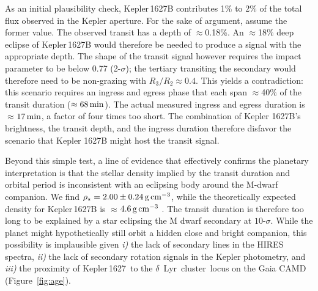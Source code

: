 \documentclass[12pt,modern,twocolumn,tighten]{aastex63}
\newcommand{\cn}{$\delta$\ Lyr\ cluster} %
\newcommand{\sn}{Kepler\,1627} %
\begin{document}

As an initial plausibility check, Kepler\,1627B contributes 1\% to 2\%
of the total flux observed in the Kepler aperture.  For the sake of
argument, assume the former value.  The observed transit has a depth
of $\approx$0.18\%.  An $\approx$18\% deep eclipse of Kepler\,1627B would
therefore be needed to produce a signal with the appropriate depth.
The shape of the transit signal however requires the impact parameter
to be below 0.77 (2-$\sigma$); the tertiary transiting the secondary
would therefore need to be non-grazing with $R_3/R_2 \approx 0.4$.
This yields a contradiction:  this scenario requires an ingress
and egress phase that each span $\approx$40\% of the transit duration
($\approx 68\,{\rm min}$).  The actual measured ingress and egress
duration is $\approx$$17\,{\rm min}$, a factor of four times too
short.  The combination of Kepler 1627B's brightness, the transit
depth, and the ingress duration therefore disfavor the scenario that
Kepler 1627B might host the transit signal.  

Beyond this simple test, a line of evidence that
effectively confirms the planetary interpretation is that the stellar density
implied by the transit duration and orbital period is inconsistent
with an eclipsing body around the M-dwarf companion.  We find
$\rho_\star = 2.00 \pm 0.24\,{\rm g\,cm}^{-3}$, while the
theoretically expected density for Kepler\,1627B  is $\approx$$4.6\,{\rm
g\,cm}^{-3}$ \citep{baraffe_new_2015}.
The transit duration is therefore too long to be explained by a star
eclipsing the M dwarf secondary at $10$-$\sigma$. While the planet
might hypothetically still orbit a hidden close and bright companion,
this possibility is implausible given {\it i)} the lack of secondary
lines in the HIRES spectra, {\it ii)} the lack of secondary
rotation signals in the Kepler photometry, and {\it iii)} the proximity
of \sn\ to the \cn\ locus on the Gaia CAMD (Figure~\ref{fig:age}).

\end{document}
